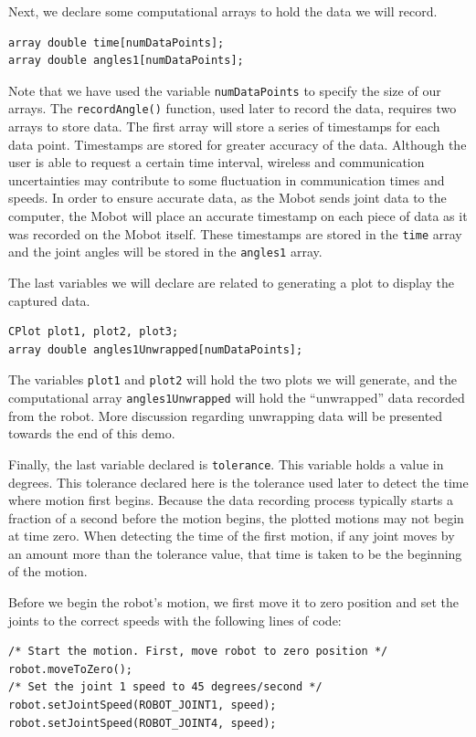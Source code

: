 \documentclass{article}
\begin{document}
Next, we declare some computational arrays to hold the data we will record.
\begin{verbatim}
array double time[numDataPoints];
array double angles1[numDataPoints];
\end{verbatim}
Note that we have used the variable \texttt{numDataPoints} to specify the size
of our arrays. The \texttt{recordAngle()} function, used later to record the data,
requires two arrays to store data. The first array will store a series of timestamps
for each data point. Timestamps are stored for greater accuracy of the data. Although
the user is able to request a certain time interval, wireless and communication 
uncertainties may contribute to some fluctuation in communication times and speeds. 
In order to ensure accurate data, as the Mobot sends joint data to the computer, 
the Mobot will place an accurate timestamp on each piece of data as it was recorded
on the Mobot itself. These timestamps are stored in the \texttt{time} array and
the joint angles will be stored in the \texttt{angles1} array.

The last variables we will declare are related to generating a plot to display
the captured data. 
\begin{verbatim}
CPlot plot1, plot2, plot3;
array double angles1Unwrapped[numDataPoints];
\end{verbatim}
The variables \texttt{plot1} and \texttt{plot2} will hold the two plots we will
generate, and the computational array \texttt{angles1Unwrapped} will hold
the ``unwrapped'' data recorded from the robot. More discussion regarding
unwrapping data will be presented towards the end of this demo.

Finally, the last variable declared is \texttt{tolerance}. This variable 
holds a value in degrees. This tolerance declared here is the tolerance used
later to detect the time where motion first begins. Because the data recording 
process typically starts a fraction of a second before the motion begins, the
plotted motions may not begin at time zero. When detecting the time of the
first motion, if any joint moves by an amount more than the tolerance value, 
that time is taken to be the beginning of the motion.

Before we begin the robot's motion, we first move it to zero position and set the
joints to the correct speeds with the following lines of code:
\begin{verbatim}
/* Start the motion. First, move robot to zero position */
robot.moveToZero();
/* Set the joint 1 speed to 45 degrees/second */
robot.setJointSpeed(ROBOT_JOINT1, speed);
robot.setJointSpeed(ROBOT_JOINT4, speed);
\end{verbatim}
\end{document}
